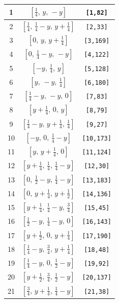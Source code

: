 \documentclass[fleqn,8pt]{jsarticle}
\begin{document}
\begin{longtable}{ccc}
1 & $\left[ \frac{1}{4},\, y,\, - y \right]$ & {\tt [1,82]} \\ \hline
2 & $\left[ \frac{1}{4},\, \frac{1}{4} - y,\, y + \frac{1}{4} \right]$ & {\tt [2,33]} \\ \hline
3 & $\left[ 0,\, y,\, y + \frac{1}{4} \right]$ & {\tt [3,169]} \\ \hline
4 & $\left[ 0,\, \frac{1}{4} - y,\, - y \right]$ & {\tt [4,122]} \\ \hline
5 & $\left[ - y,\, \frac{1}{4},\, y \right]$ & {\tt [5,128]} \\ \hline
6 & $\left[ y,\, - y,\, \frac{1}{4} \right]$ & {\tt [6,180]} \\ \hline
7 & $\left[ \frac{1}{4} - y,\, - y,\, 0 \right]$ & {\tt [7,83]} \\ \hline
8 & $\left[ y + \frac{1}{4},\, 0,\, y \right]$ & {\tt [8,79]} \\ \hline
9 & $\left[ \frac{1}{4} - y,\, y + \frac{1}{4},\, \frac{1}{4} \right]$ & {\tt [9,27]} \\ \hline
10 & $\left[ - y,\, 0,\, \frac{1}{4} - y \right]$ & {\tt [10,173]} \\ \hline
11 & $\left[ y,\, y + \frac{1}{4},\, 0 \right]$ & {\tt [11,124]} \\ \hline
12 & $\left[ y + \frac{1}{4},\, \frac{1}{4},\, \frac{1}{4} - y \right]$ & {\tt [12,30]} \\ \hline
13 & $\left[ 0,\, \frac{1}{2} - y,\, \frac{1}{4} - y \right]$ & {\tt [13,183]} \\ \hline
14 & $\left[ 0,\, y + \frac{1}{4},\, y + \frac{1}{2} \right]$ & {\tt [14,136]} \\ \hline
15 & $\left[ y + \frac{1}{4},\, \frac{1}{4} - y,\, \frac{3}{4} \right]$ & {\tt [15,45]} \\ \hline
16 & $\left[ \frac{1}{2} - y,\, \frac{1}{4} - y,\, 0 \right]$ & {\tt [16,143]} \\ \hline
17 & $\left[ y + \frac{1}{2},\, 0,\, y + \frac{1}{4} \right]$ & {\tt [17,190]} \\ \hline
18 & $\left[ \frac{1}{4} - y,\, \frac{3}{4},\, y + \frac{1}{4} \right]$ & {\tt [18,48]} \\ \hline
19 & $\left[ \frac{1}{4} - y,\, 0,\, \frac{1}{2} - y \right]$ & {\tt [19,92]} \\ \hline
20 & $\left[ y + \frac{1}{2},\, \frac{3}{4},\, \frac{1}{2} - y \right]$ & {\tt [20,137]} \\ \hline
21 & $\left[ \frac{3}{4},\, y + \frac{1}{4},\, \frac{1}{4} - y \right]$ & {\tt [21,38]} \\ \hline

\end{longtable}
\end{document}
